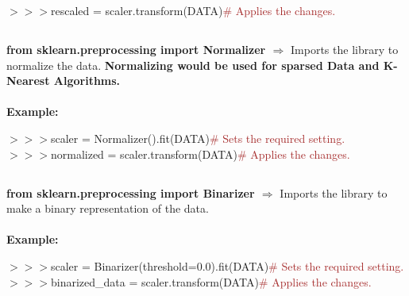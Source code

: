\documentclass[a4paper,18pt]{article}
\begin{document}
$>>>$rescaled = scaler.transform(DATA){\textcolor{brown}{\# Applies the changes.}}\\


\subsection{\colorbox {matgreen}{\color{white}{\large from sklearn.preprocessing import Normalizer}}}
\textbf{from sklearn.preprocessing import Normalizer $\Rightarrow$} Imports the library to normalize the data. {\textbf{\textcolor{important}{Normalizing would be used for sparsed Data and K-Nearest Algorithms.}}}\\\\
\textbf{Example:\\}

$>>>$scaler = Normalizer().fit(DATA){\textcolor{brown}{\# Sets the required setting.}}\\

$>>>$normalized = scaler.transform(DATA){\textcolor{brown}{\# Applies the changes.}}\\


\subsection{\colorbox {matgreen}{\color{white}{\large from sklearn.preprocessing import Binarizer}}}
\textbf{from sklearn.preprocessing import Binarizer $\Rightarrow$} Imports the library to make a binary representation of the data.\\\\
\textbf{Example:\\}

$>>>$scaler = Binarizer(threshold=0.0).fit(DATA){\textcolor{brown}{\# Sets the required setting.}}\\

$>>>$binarized\_data = scaler.transform(DATA){\textcolor{brown}{\# Applies the changes.}}\\


\end{document}
